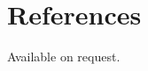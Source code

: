 \documentclass[letterpaper,11pt]{article}
\renewenvironment{itemize}{
  \begin{list}{}{
    \setlength{\leftmargin}{1.5em}
    \setlength{\itemsep}{0.2em}
    \setlength{\parsep}{0em}
  }
}{
  \end{list}
}
\begin{document}

\section*{References}
Available on request.
\end{document}
